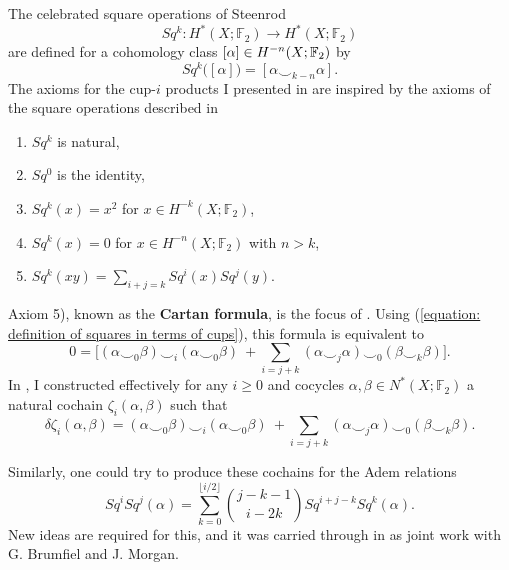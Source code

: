 The celebrated square operations of Steenrod
\begin{equation*}
Sq^k : H^*(X; \mathbb F_2) \to H^*(X; \mathbb F_2)
\end{equation*}
are defined for a cohomology class $[\alpha] \in H^{-n}(X;{\mathbb{F}_2})$ by
\begin{equation} \label{equation: definition of squares in terms of cups}
Sq^k\big([\alpha]\big) = [\alpha \smallsmile_{k-n} \alpha].
\end{equation}
The axioms for the cup-$i$ products I presented in \cite{medina2018axiomatic} are inspired by the axioms of the square operations described in \cite{steenrod1962cohomology}
\begin{enumerate}
	\item $Sq^k$ is natural,
	\item $Sq^0$ is the identity,
	\item $Sq^k(x) = x^2$ for $x \in H^{-k}(X; \mathbb F_2)$,
	\item $Sq^k(x) = 0$ for $x \in H^{-n}(X; \mathbb F_2)$ with $n>k$,
	\item $Sq^k(xy) = \sum_{i+j=k} Sq^i (x) Sq^j(y)$.
\end{enumerate}
Axiom 5), known as the \textbf{Cartan formula}, is the focus of \cite{medina2020cartan}. Using (\ref{equation: definition of squares in terms of cups}), this formula is equivalent to
\begin{equation*}
0 =
\Big[ (\alpha \smallsmile_0 \beta) \smallsmile_i (\alpha \smallsmile_0 \beta)\ +
\sum_{i=j+k} (\alpha \smallsmile_j \alpha) \smallsmile_0 (\beta \smallsmile_k \beta) \Big].
\end{equation*}
In \cite{medina2020cartan}, I constructed effectively for any $i \geq 0$ and cocycles $\alpha, \beta \in N^*(X; \mathbb F_2)$ a natural cochain $\zeta_i(\alpha, \beta)$ such that
\begin{equation*}
\delta \zeta_i(\alpha, \beta) =
(\alpha \smallsmile_0 \beta) \smallsmile_i (\alpha \smallsmile_0 \beta)\ + \sum_{i=j+k} (\alpha \smallsmile_j \alpha) \smallsmile_0 (\beta \smallsmile_k \beta).
\end{equation*}

Similarly, one could try to produce these cochains for the Adem relations
\begin{equation*}
Sq^i Sq^j(\alpha) = \sum_{k=0}^{\lfloor i/2 \rfloor} {j-k-1 \choose i-2k} Sq^{i+j-k} Sq^k(\alpha).
\end{equation*}
New ideas are required for this, and it was carried through in \cite{medina2021adem} as joint work with G. Brumfiel and J. Morgan.

